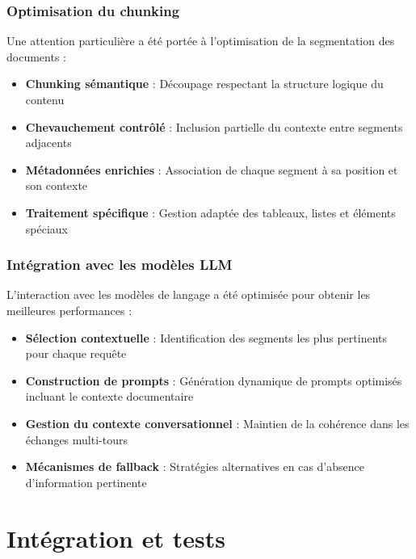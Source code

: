 \subsubsection{Optimisation du chunking}

Une attention particulière a été portée à l'optimisation de la segmentation des documents :

\begin{itemize}
  \item \textbf{Chunking sémantique} : Découpage respectant la structure logique du contenu
  
  \item \textbf{Chevauchement contrôlé} : Inclusion partielle du contexte entre segments adjacents
  
  \item \textbf{Métadonnées enrichies} : Association de chaque segment à sa position et son contexte
  
  \item \textbf{Traitement spécifique} : Gestion adaptée des tableaux, listes et éléments spéciaux
\end{itemize}

\subsubsection{Intégration avec les modèles LLM}

L'interaction avec les modèles de langage a été optimisée pour obtenir les meilleures performances :

\begin{itemize}
  \item \textbf{Sélection contextuelle} : Identification des segments les plus pertinents pour chaque requête
  
  \item \textbf{Construction de prompts} : Génération dynamique de prompts optimisés incluant le contexte documentaire
  
  \item \textbf{Gestion du contexte conversationnel} : Maintien de la cohérence dans les échanges multi-tours
  
  \item \textbf{Mécanismes de fallback} : Stratégies alternatives en cas d'absence d'information pertinente
\end{itemize}

\section{Intégration et tests}

